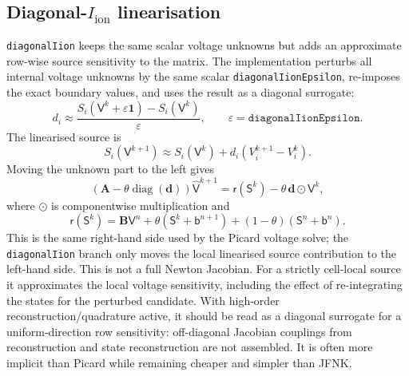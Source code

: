 \documentclass[11pt,a4paper]{article}
\newcommand{\code}[1]{\texttt{\small #1}}
\newcommand{\Iion}{I_{\mathrm{ion}}}
\newcommand{\Aimp}{\mathbf{A}}
\newcommand{\Bimp}{\mathbf{B}}
\begin{document}
\subsection{Diagonal-\texorpdfstring{$\Iion$}{Iion} linearisation}
\label{sec:diagonal}

\code{diagonalIion} keeps the same scalar voltage unknowns but adds an
approximate row-wise source sensitivity to the matrix. The implementation
perturbs all internal voltage unknowns by the same scalar
\code{diagonalIionEpsilon}, re-imposes the exact boundary values, and uses the
result as a diagonal surrogate:
\begin{equation}
  d_i
  \approx
  \frac{S_i(\mathsf{V}^k+\varepsilon\mathbf{1})-S_i(\mathsf{V}^k)}
       {\varepsilon},
  \qquad
  \varepsilon=\texttt{diagonalIionEpsilon}.
  \label{eq:diagonal-derivative}
\end{equation}
The linearised source is
\begin{equation}
  S_i(\mathsf{V}^{k+1})
  \approx
  S_i(\mathsf{V}^{k})
  + d_i\left(V^{k+1}_i-V^k_i\right).
\end{equation}
Moving the unknown part to the left gives
\begin{equation}
  \left(\Aimp-\theta\operatorname{diag}(\mathbf{d})\right)
  \widehat{\mathsf{V}}^{k+1}
  =
  \mathsf{r}(\mathsf{S}^k)
  -
  \theta\,\mathbf{d}\odot\mathsf{V}^{k},
  \label{eq:diagonal-system}
\end{equation}
where $\odot$ is componentwise multiplication and
\begin{equation}
  \mathsf{r}(\mathsf{S}^{k})
  =
  \Bimp\mathsf{V}^{n}
  +\theta\left(\mathsf{S}^{k}+\mathsf{b}^{n+1}\right)
  +(1-\theta)\left(\mathsf{S}^{n}+\mathsf{b}^{n}\right).
\end{equation}
This is the same right-hand side used by the Picard voltage solve; the
\code{diagonalIion} branch only moves the local linearised source contribution
to the left-hand side. This is not a full Newton Jacobian. For a strictly
cell-local source it approximates the local voltage sensitivity, including the
effect of re-integrating the states for the perturbed candidate. With
high-order reconstruction/quadrature active, it should be read as a diagonal
surrogate for a uniform-direction row sensitivity: off-diagonal Jacobian
couplings from reconstruction and state reconstruction are not assembled. It
is often more implicit than Picard while remaining cheaper and simpler than
JFNK.
\end{document}
